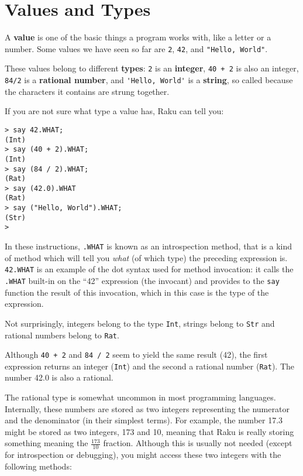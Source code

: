 \section{Values and Types}
\label{values_and_types}

A {\bf value} is one of the basic things a program works with, like a
letter or a number.  Some values we have seen so far are {\tt 2},
{\tt 42}, and \verb'"Hello, World"'.

These values belong to different {\bf types}:
{\tt 2} is an {\bf integer}, {\tt 40 + 2} is also an integer, 
{\tt 84/2} is a {\bf rational number},
and \verb"'Hello, World'" is a {\bf string}, so called 
because the characters it contains are strung together.

If you are not sure what type a value has, Raku can
tell you:

\begin{verbatim}
> say 42.WHAT;
(Int)
> say (40 + 2).WHAT;
(Int)
> say (84 / 2).WHAT;
(Rat)
> say (42.0).WHAT
(Rat)
> say ("Hello, World").WHAT;
(Str)
>
\end{verbatim}
%
In these instructions, {\tt .WHAT} is known as an 
introspection method, that is a kind of method which 
will tell you \emph{what} (of which type) the preceding 
expression is. {\tt 42.WHAT} is an example of the dot 
syntax used for method invocation: it calls the {\tt .WHAT} 
built-in on the ``42'' expression (the invocant) and provides 
to the {\tt say} function the result of this invocation, 
which in this case is the type of the expression.

Not surprisingly, integers belong to the type {\tt Int},
strings belong to {\tt Str} and rational 
numbers belong to {\tt Rat}.  

Although {\tt 40 + 2} and {\tt 84 / 2} seem to yield the 
same result (42), the first expression returns an integer 
({\tt Int}) and the second a rational number ({\tt Rat}). 
The number 42.0 is also a rational.

The rational type is somewhat uncommon in most programming 
languages. Internally, these numbers are stored as two 
integers representing the numerator and the denominator 
(in their simplest terms). For example, the number 17.3 
might be stored as two integers, 173 and 10, meaning that 
Raku is really storing something meaning the $\frac{173}{10}$ 
fraction. Although this is usually not needed (except 
for introspection or debugging), you might access these 
two integers with the following methods:

